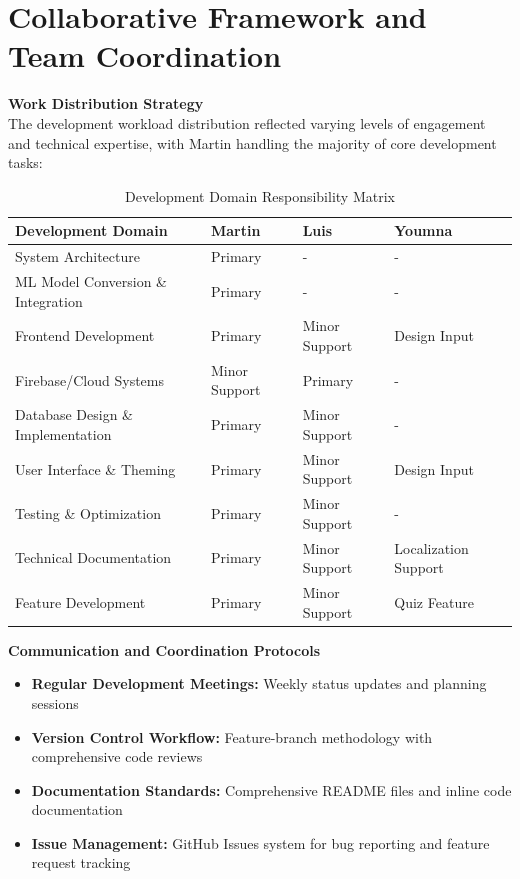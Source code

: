 \section{Collaborative Framework and Team Coordination}

\textbf{Work Distribution Strategy}\\
The development workload distribution reflected varying levels of engagement 
and technical expertise, with Martin handling the majority of core development tasks:

\begin{table}[H]
\centering
\begin{tabular}{|l|l|l|l|}
\hline
\textbf{Development Domain} & \textbf{Martin} & \textbf{Luis} & \textbf{Youmna} \\
\hline
System Architecture & Primary & - & - \\
ML Model Conversion \& Integration & Primary & - & - \\
Frontend Development & Primary & Minor Support & Design Input \\
Firebase/Cloud Systems & Minor Support & Primary & - \\
Database Design \& Implementation & Primary & Minor Support & - \\
User Interface \& Theming & Primary & Minor Support & Design Input \\
Testing \& Optimization & Primary & Minor Support & - \\
Technical Documentation & Primary & Minor Support & Localization Support \\
Feature Development & Primary & Minor Support & Quiz Feature \\
\hline
\end{tabular}
\caption{Development Domain Responsibility Matrix}
\label{tab:work_distribution}
\end{table}

\textbf{Communication and Coordination Protocols}
\begin{itemize}
    \item \textbf{Regular Development Meetings:} Weekly status updates and planning sessions
    \item \textbf{Version Control Workflow:} Feature-branch methodology with comprehensive code reviews
    \item \textbf{Documentation Standards:} Comprehensive README files and inline code documentation
    \item \textbf{Issue Management:} GitHub Issues system for bug reporting and feature request tracking
\end{itemize}


